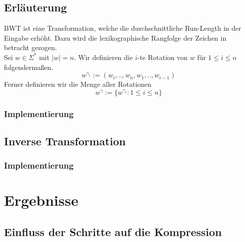 \documentclass{article}
\begin{document}
\subsection{Erläuterung}
BWT ist eine Transformation, welche die durchschnittliche Run-Length in der Eingabe erhöht. Dazu wird die lexikographische Rangfolge der Zeichen in betracht gezogen.
\\[.5cm]
Sei $w\in\Sigma^*$ mit $|w|=n$. Wir definieren die $i$-te Rotation von $w$ für $1\leq i\leq n$ folgendermaßen.
\begin{equation}
    w^{\gamma_i}:=(w_i,..,w_n,w_1,..,w_{i-1})
\end{equation}
Ferner definieren wir die Menge aller Rotationen
\begin{equation}
    w^\gamma:=\{w^{\gamma_i}:1\leq i\leq n\}
\end{equation}

\subsubsection{Implementierung}
\subsection{Inverse Transformation}
\subsubsection{Implementierung}
\newpage
\section{Ergebnisse}
\subsection{Einfluss der Schritte auf die Kompression}
\printbibliography[heading=bibintoc]
\end{document}
